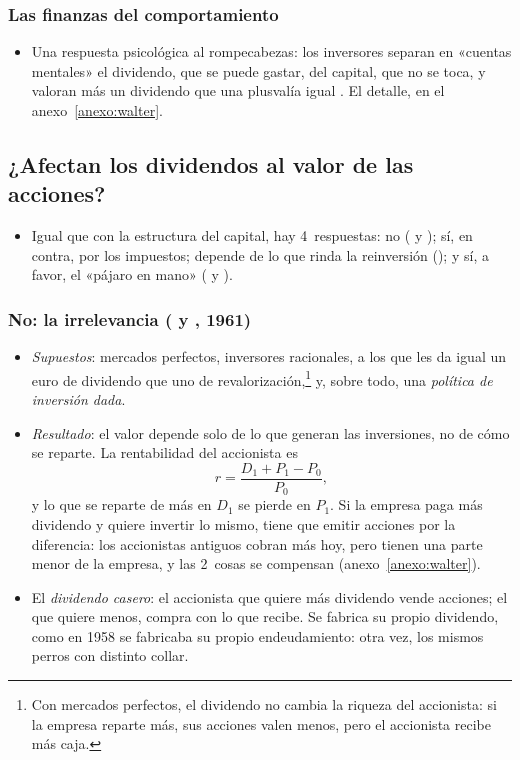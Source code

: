 \documentclass[11pt]{article}
\begin{document}
\subsubsection{Las finanzas del comportamiento}\label{sec:conductual-dividendos}

\begin{itemize}
\item Una respuesta psicológica al rompecabezas: los inversores separan en «cuentas mentales» el dividendo, que se puede gastar, del capital, que no se toca, y valoran más un dividendo que una plusvalía igual\nocite{ShefrinStatman1984} . El detalle, en el anexo~\ref{anexo:walter}.
\end{itemize}

\subsection{¿Afectan los dividendos al valor de las acciones?}\label{sec:afectan}

\begin{itemize}
\item Igual que con la estructura del capital, hay 4~respuestas: no ( y ); sí, en contra, por los impuestos; depende de lo que rinda la reinversión (); y sí, a favor, el «pájaro en mano» ( y ).
\end{itemize}

\subsubsection{No: la irrelevancia ( y , 1961)}\label{sec:irrelevancia-dividendos}

\begin{itemize}
\item \emph{Supuestos}: mercados perfectos, inversores racionales, a los que les da igual un euro de dividendo que uno de revalorización,\footnote{Con mercados perfectos, el dividendo no cambia la riqueza del accionista: si la empresa reparte más, sus acciones valen menos, pero el accionista recibe más caja.} y, sobre todo, una \emph{política de inversión dada}.
\item \emph{Resultado}: el valor depende solo de lo que generan las inversiones, no de cómo se reparte. La rentabilidad del accionista es
  \[
  r=\frac{D_1+P_1-P_0}{P_0},
  \]
  y lo que se reparte de más en $D_1$ se pierde en $P_1$. Si la empresa paga más dividendo y quiere invertir lo mismo, tiene que emitir acciones por la diferencia: los accionistas antiguos cobran más hoy, pero tienen una parte menor de la empresa, y las 2~cosas se compensan\nocite{MillerModigliani1961Dividend} (anexo~\ref{anexo:walter}).
\item El \emph{dividendo casero}: el accionista que quiere más dividendo vende acciones; el que quiere menos, compra con lo que recibe. Se fabrica su propio dividendo, como en 1958 se fabricaba su propio endeudamiento: otra vez, los mismos perros con distinto collar.
\end{itemize}
\end{document}
